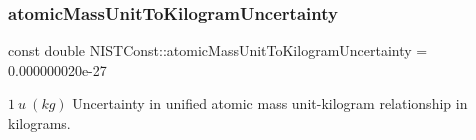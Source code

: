 \subsubsection{\texorpdfstring{atomic\+Mass\+Unit\+To\+Kilogram\+Uncertainty}{atomicMassUnitToKilogramUncertainty}}
{\footnotesize\ttfamily const double N\+I\+S\+T\+Const\+::atomic\+Mass\+Unit\+To\+Kilogram\+Uncertainty = 0.\+000000020e-\/27}

$1\ u\ (kg)$ Uncertainty in unified atomic mass unit-\/kilogram relationship in kilograms. 